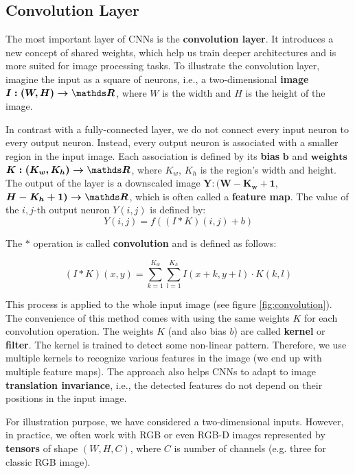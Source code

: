 \subsection{Convolution Layer}
The most important layer of CNNs is the \textbf{convolution layer}. It introduces a new concept of shared weights, which help us train deeper architectures and is more suited for image processing tasks. To illustrate the convolution layer, imagine the input as a square of neurons, i.e., a two-dimensional \textbf{image} $\boldsymbol{I: (W, H) \rightarrow \real}$, where ${W}$ is the width and ${H}$ is the height of the image. 

In contrast with a fully-connected layer, we do not connect every input neuron to every output neuron. Instead, every output neuron is associated with a smaller region in the input image. Each association is defined by its \textbf{bias} $\boldsymbol{b}$ and $\textbf{weights}$ $\boldsymbol{K:(K_w, K_h) \rightarrow \real}$, where $K_w$, $K_h$ is the region's width and height. The output of the layer is a downscaled image $\boldsymbol{Y:(W - K_w + 1,}$ $\boldsymbol{H - K_h + 1)  \rightarrow \real}$, which is often called a \textbf{feature map}. The value of the $i, j$-th output neuron $Y(i,j)$ is defined by: 
$$
Y(i, j) = f\left((I * K)(i,j) + b\right)
$$

The $*$ operation is called \textbf{convolution} and is defined as follows:

$$
(I * K)(x, y) = \sum\limits_{k = 1}^{K_w}\sum\limits_{l = 1}^{K_h} I(x + k, y + l) \cdot K(k, l)
$$

This process is applied to the whole input image (see figure \ref{fig:convolution}). The convenience of this method comes with using the same weights $K$ for each convolution operation. The weights $K$ (and also bias $b$) are called \textbf{kernel} or \textbf{filter}. The kernel is trained to detect some non-linear pattern. Therefore, we use multiple kernels to recognize various features in the image (we end up with multiple feature maps). The approach also helps CNNs to adapt to image \textbf{translation invariance}, i.e., the detected features do not depend on their positions in the input image.

For illustration purpose, we have considered a two-dimensional inputs. However, in practice, we often work with RGB or even RGB-D images represented by \textbf{tensors} of shape $(W, H, C)$, where $C$ is number of channels (e.g. three for classic RGB image). 

